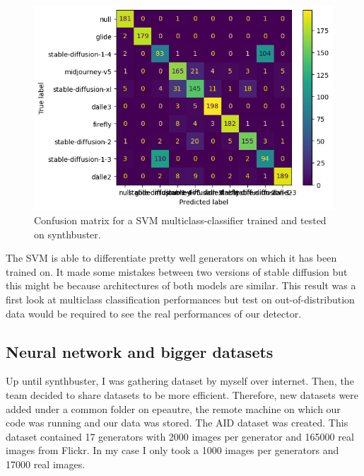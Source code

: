 \documentclass[12pt,a4paper]{article}
\begin{document}
\begin{figure}[H]
    \includegraphics*[width=\textwidth]{img/confusion.png}
    \caption{Confusion matrix for a SVM multiclass-classifier trained and tested on synthbuster.}
\end{figure}

The SVM is able to differentiate pretty well generators on which it has been trained on. It made some mistakes between two versions of stable diffusion but this might be because architectures of both models are similar. This result was a first look at multiclass classification performances but test on out-of-distribution data would be required to see the real performances of our detector.

\subsection{Neural network and bigger datasets}
Up until synthbuster, I was gathering dataset by myself over internet. Then, the team decided to share datasets to be more efficient. Therefore, new datasets were added under a common folder on epeautre, the remote machine on which our code was running and our data was stored. The AID dataset was created. This dataset contained 17 generators with 2000 images per generator and 165000 real images from Flickr. In my case I only took a 1000 images per generators and 17000 real images.\\
\end{document}

